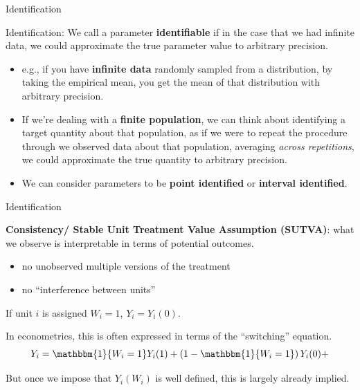\documentclass[xcolor={dvipsnames}, handout]{beamer}
\begin{document}
\begin{frame}{Identification}

\begin{wideitemize}
\item Identification: We call a parameter \textbf{identifiable} if in the case that we had infinite data, we could approximate the true parameter value to arbitrary precision. \pause
\begin{itemize}
\item e.g., if you have \textbf{infinite data} randomly sampled from a distribution, by taking the empirical mean, you get the mean of that distribution with arbitrary precision.\pause
\item If we're dealing with a \textbf{finite population}, we can think about identifying a target quantity about that population, as if we were to repeat the procedure through we observed data about that population, averaging \textit{across repetitions}, we could approximate the true quantity to arbitrary precision.\pause
\item We can consider parameters to be \textbf{point identified} or \textbf{interval identified}. 
\end{itemize}
\end{wideitemize}

\end{frame}



\begin{frame}{Identification}

\begin{wideitemize}
\item \textbf{Consistency/ Stable Unit Treatment Value Assumption (SUTVA)}: what we observe is interpretable in terms of potential outcomes. \pause
\begin{itemize}
\item no unobserved multiple versions of the treatment
\item no ``interference between units''\pause
\end{itemize}
\item If unit $i$ is assigned $W_i = 1$, $Y_i = Y_i(0)$. \pause
\item In econometrics, this is often expressed in terms of the ``switching'' equation.
\[
Y_i = \mathbbm{1}\{W_i = 1 \}Y_i(1) + \left(1- \mathbbm{1}\{W_i = 1 \}\right) Y_i(0) + 
\]\pause
\item But once we impose that $Y_i(W_i)$ is well defined, this is largely already implied. 
\end{wideitemize}



\end{frame}
\end{document}
